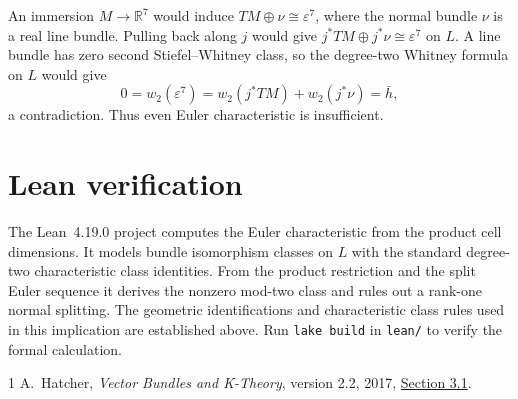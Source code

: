 \documentclass[10pt]{article}
\begin{document}
An immersion \(M\longrightarrow\mathbb R^7\) would induce
\(TM\oplus\nu\cong\varepsilon^7\), where the normal bundle \(\nu\)
is a real line bundle. Pulling back along \(j\) would give
\(j^*TM\oplus j^*\nu\cong\varepsilon^7\) on \(L\). A line bundle
has zero second Stiefel--Whitney class, so the degree-two Whitney
formula on \(L\) would give
\[
  0=w_2(\varepsilon^7)=w_2(j^*TM)+w_2(j^*\nu)=\bar h,
\]
a contradiction. Thus even Euler characteristic is insufficient.

\section*{Lean verification}

The Lean~4.19.0 project computes the Euler characteristic from
the product cell dimensions. It models bundle isomorphism classes
on \(L\) with the standard degree-two characteristic class identities.
From the product restriction and the split Euler sequence it derives
the nonzero mod-two class and rules out a rank-one normal splitting.
The geometric identifications and characteristic class rules used
in this implication are established above. Run \verb|lake build| in
\verb|lean/| to verify the formal calculation.

\begin{thebibliography}{1}
A.~Hatcher, \emph{Vector Bundles and K-Theory}, version 2.2, 2017,
\href{https://pi.math.cornell.edu/~hatcher/VBKT/VB.pdf}{Section 3.1}.
\end{thebibliography}
\end{document}
